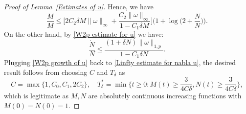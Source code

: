 \documentclass[12pt,letterpaper]{article}
\theoremstyle{plain}
\begin{document}
\begin{proof}[Proof of Lemma~\ref{Estimates of u}]
Hence, we have
\begin{equation*}
 \frac{\dot M}{M}\le   \Big[2C_2\delta M\lVert\omega\rVert_\infty+\frac{C_2 \lVert\omega\rVert_\infty}{1-C_1\delta M}\Big]\Big(1+\log 
 \Big(2+\frac{\dot N}{N}\Big)\Big).
\end{equation*}
On the other hand, by \eqref{W2p estimate for u} we have:
\begin{equation}\label{W2p growth of u}
\frac{\dot N}{N}\le \frac{(1+\delta N)\lVert\omega\rVert_{1,p}}{1-C_1\delta N}.
\end{equation}
Plugging \eqref{W2p growth of u} back to \eqref{Linfty estimate for nabla u}, the desired result follows from choosing $C$ and $T_\delta$ as
\begin{equation*}
C=\max\{1,C_0,C_1,2C_2\},\quad T_\delta^*=\min\big\{t\ge 0: M(t)\ge \frac{3}{4C\delta}, N(t)\ge \frac{3}{4C\delta}\big\},     
\end{equation*}
which is legitimate as $M,N$ are absolutely continuous increasing functions with $M(0)=N(0)=1$.
\end{proof}
\end{document}
